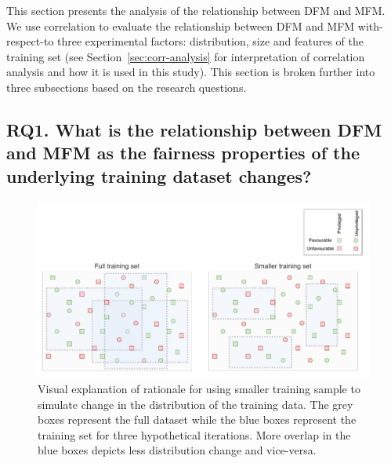 \documentclass[conference]{IEEEtran}
\begin{document}
This section presents the analysis of the relationship between DFM and
MFM. We use correlation to evaluate the relationship between DFM and
MFM with-respect-to three experimental factors: distribution, size and
features of the training set (see Section \ref{sec:corr-analysis} for
interpretation of correlation analysis and how it is used in this
study). This section is broken further into three subsections based on
the research questions.

\subsection{RQ1. What is the relationship between DFM and MFM as
the fairness properties of the underlying training dataset
changes?}\label{sec:results-full-rel}

\begin{figure}
  \centering
  \includegraphics[width=\linewidth]{shuffle.pdf}
  \caption{Visual explanation of rationale for using smaller training
    sample to simulate change in the distribution of the training
    data. The grey boxes represent the full dataset while the blue
    boxes represent the training set for three hypothetical
    iterations. More overlap in the blue boxes depicts less
    distribution change and vice-versa.}
  \label{fig:shuffle}
\end{figure}
\end{document}
